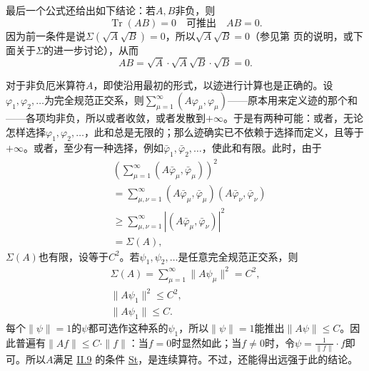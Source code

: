 \documentclass[fontsize=13pt,twoside,openany,headings=normal,parskip=false,bookmarkpackage=false,DIV=calc]{scrbook}
\newcommand{\srcpage}[1]{\hyperref[origpage-#1]{\pageref*{origpage-#1}}}
\begin{document}
最后一个公式还给出如下结论：若$A,\allowbreak B$非负，则
\[
\operatorname{Tr}(AB)=0\quad\text{可推出}\quad AB=0.
\]
因为前一条件是说$\Sigma(\sqrt A\sqrt B)=0$，所以$\sqrt A\sqrt B=0$（参见第 \srcpage{96} 页的说明，或下面关于$\Sigma$的进一步讨论），从而
\[
AB=\sqrt A\cdot\sqrt A\sqrt B\cdot\sqrt B=0.
\]

对于非负厄米算符$A$，即使沿用最初的形式，以迹进行计算也是正确的。设$\varphi_1,\allowbreak \varphi_2,\allowbreak \ldots$为完全规范正交系，则\hypertarget{origpage-98}{}\label{origpage-98}$\sum_{\mu=1}^{\infty}(A\varphi_\mu,\allowbreak \varphi_\mu)$——原本用来定义迹的那个和——各项均非负，所以或者收敛，或者发散到$+\infty$。于是有两种可能：或者，无论怎样选择$\varphi_1,\allowbreak \varphi_2,\allowbreak \ldots$，此和总是无限的；那么迹确实已不依赖于选择而定义，且等于$+\infty$。或者，至少有一种选择，例如$\bar\varphi_1,\allowbreak \bar\varphi_2,\allowbreak \ldots$，使此和有限。此时，由于
\begin{align*}
&\left(\sum_{\mu=1}^{\infty}(A\bar\varphi_\mu,\bar\varphi_\mu)\right)^2\\
&=\sum_{\mu,\nu=1}^{\infty}(A\bar\varphi_\mu,\bar\varphi_\mu)
(A\bar\varphi_\nu,\bar\varphi_\nu)\\
&\geq\sum_{\mu,\nu=1}^{\infty}|(A\bar\varphi_\mu,\bar\varphi_\nu)|^2\\
&=\Sigma(A),
\end{align*}
$\Sigma(A)$也有限，设等于$C^2$。若$\psi_1,\allowbreak \psi_2,\allowbreak \ldots$是任意完全规范正交系，则
\begin{gather*}
\Sigma(A)=\sum_{\mu=1}^{\infty}\|A\psi_\mu\|^2=C^2,\\
\|A\psi_1\|^2\leq C^2,\\
\|A\psi_1\|\leq C.
\end{gather*}
每个$\|\psi\|=1$的$\psi$都可选作这种系的$\psi_1$，所以$\|\psi\|=1$能推出$\|A\psi\|\leq C$。因此普遍有$\|Af\|\leq C\cdot\|f\|$：当$f=0$时显然如此；当$f\ne0$时，令$\psi=\frac1{\|f\|}\cdot f$即可。所以$A$满足 \hyperref[sec:II.9]{II.9} 的条件 \hyperref[eq:II.9.St]{St}，是连续算符。不过，还能得出远强于此的结论。
\end{document}
